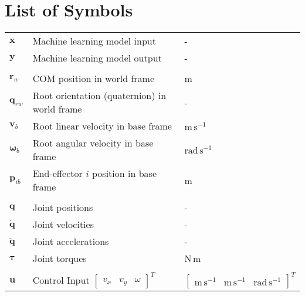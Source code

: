 \chapter*{List of Symbols}

\begin{table}[h!]
  \centering
  \begin{tabular}{lll}
    $\mathbf x$ & Machine learning model input & - \\
    $\mathbf y$ & Machine learning model output & - \\
    & & \\

    $\mathbf r_w$ & COM position in world frame & m \\
    $\mathbf q_{rw}$ & Root orientation (quaternion) in world frame & - \\
    $\mathbf v_b$ & Root linear velocity in base frame &
    $\text{m}\,\text{s}^{-1}$ \\
    $\mathbf \omega_b$ & Root angular velocity in base frame &
    $\text{rad}\,\text{s}^{-1}$ \\
    $\mathbf p_{ib}$ & End-effector $i$ position in base frame & m \\
    & & \\

    $\mathbf q$ & Joint positions & - \\
    $\mathbf{\dot q}$ & Joint velocities & - \\
    $\mathbf{\ddot q}$ & Joint accelerations & - \\
    $\mathbf \tau$ & Joint torques & N\,m \\
    & & \\

    $\mathbf u$ & Control Input $
    \begin{bmatrix}
      v_x & v_y & \omega
    \end{bmatrix}^T$ & $
    \begin{bmatrix}
      \text{m}\,\text{s}^{-1} & \text{m}\,\text{s}^{-1} &
      \text{rad}\,\text{s}^{-1}
    \end{bmatrix}^T$ \\
  \end{tabular}
\end{table}
